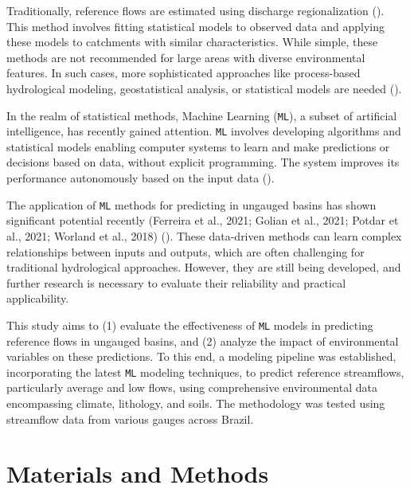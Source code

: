 \documentclass[12pt]{article}
\begin{document}
\par Traditionally, reference flows are estimated using discharge regionalization (\cite{laaha2006}). This method involves fitting statistical models to observed data and applying these models to catchments with similar characteristics. While simple, these methods are not recommended for large areas with diverse environmental features. In such cases, more sophisticated approaches like process-based hydrological modeling, geostatistical analysis, or statistical models are needed (\cite{bloschl2013}).

\par In the realm of statistical methods, Machine Learning (\texttt{ML}), a subset of artificial intelligence, has recently gained attention. \texttt{ML} involves developing algorithms and statistical models enabling computer systems to learn and make predictions or decisions based on data, without explicit programming. The system improves its performance autonomously based on the input data (\cite{kuhn2013}).

\par The application of \texttt{ML} methods for predicting in ungauged basins has shown significant potential recently (Ferreira et al., 2021; Golian et al., 2021; Potdar et al., 2021; Worland et al., 2018) (\cite{ferreira2021, golian2021, potdar2021, worland2018}). These data-driven methods can learn complex relationships between inputs and outputs, which are often challenging for traditional hydrological approaches. However, they are still being developed, and further research is necessary to evaluate their reliability and practical applicability.

\par This study aims to (1) evaluate the effectiveness of \texttt{ML} models in predicting reference flows in ungauged basins, and (2) analyze the impact of environmental variables on these predictions. To this end, a modeling pipeline was established, incorporating the latest \texttt{ML} modeling techniques, to predict reference streamflows, particularly average and low flows, using comprehensive environmental data encompassing climate, lithology, and soils. The methodology was tested using streamflow data from various gauges across Brazil.

\section{Materials and Methods} \label{sec:methods}
\end{document}

